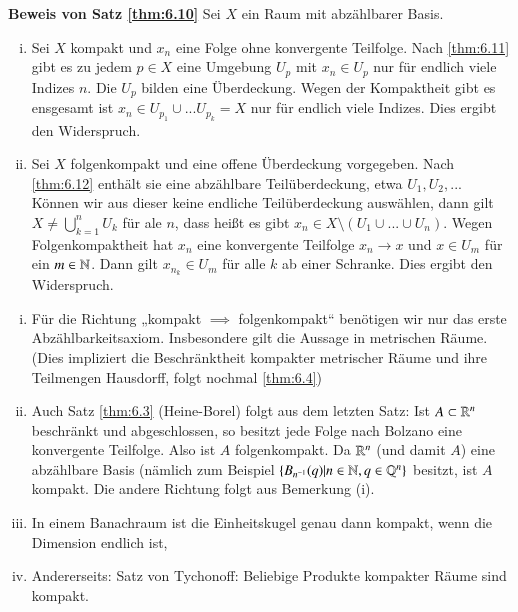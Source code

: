 \documentclass[a4paper,10pt]{scrartcl}
\begin{document}
\begin{seg}{\textbf{Beweis von Satz \ref{thm:6.10}}}
 Sei $X$ ein Raum mit abzählbarer Basis.
\begin{enumerate}[(i)]
 \item Sei $X$ kompakt und $x_n$ eine Folge ohne konvergente Teilfolge. Nach \ref{thm:6.11} gibt es zu jedem $p\in X$ eine Umgebung $U_p$ mit $x_n\in U_p$ nur für endlich viele Indizes $n$. Die $U_p$ bilden eine Überdeckung. Wegen der Kompaktheit gibt es ensgesamt ist $x_n\in U_{p_1}\cup... U_{p_k}=X$ nur für endlich viele Indizes. Dies ergibt den Widerspruch.
 \item Sei $X$ folgenkompakt und eine offene Überdeckung vorgegeben. Nach \ref{thm:6.12} enthält sie eine abzählbare Teilüberdeckung, etwa $U_1, U_2, ...$ Können wir aus dieser keine endliche Teilüberdeckung auswählen, dann gilt $X\neq \bigcup_{k=1}^nU_k$ für ale $n$, dass heißt es gibt $x_n\in X\setminus(U_1\cup...\cup U_n)$. Wegen Folgenkompaktheit hat $x_n$ eine konvergente Teilfolge $x_n \to x$ und $x\in U_m$ für ein $m\in \mathbb{N}$. Dann gilt $x_{n_k}\in U_m$ für alle $k$ ab einer Schranke. Dies ergibt den Widerspruch.
\end{enumerate}
\end{seg}
\begin{note*}
 \begin{enumerate}[(i)]
  \item Für die Richtung „kompakt $\implies$ folgenkompakt“ benötigen wir nur das erste Abzählbarkeitsaxiom. 
Insbesondere gilt die Aussage in metrischen Räume.  
(Dies impliziert die Beschränktheit kompakter metrischer Räume und ihre Teilmengen Hausdorff, folgt nochmal \ref{thm:6.4})
\item Auch Satz \ref{thm:6.3} (Heine-Borel) folgt aus dem letzten Satz: Ist $A\subset \mathbb{R}^n$ beschränkt und abgeschlossen, so besitzt jede Folge nach Bolzano eine konvergente Teilfolge.
Also ist $A$ folgenkompakt. Da $\mathbb{R}^n$ (und damit $A$) eine abzählbare Basis (nämlich zum Beispiel $\{B_{n^{-1}} (q)|n\in \mathbb{N}, q\in \mathbb{Q}^n\}$ besitzt,
ist $A$ kompakt. Die andere Richtung folgt aus Bemerkung (i).
\item In einem Banachraum ist die Einheitskugel genau dann kompakt, wenn die Dimension endlich ist,
\item Andererseits: Satz von Tychonoff: Beliebige Produkte kompakter Räume sind kompakt.
 \end{enumerate}
\end{note*}
\end{document}
